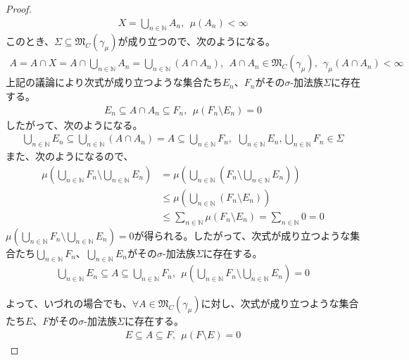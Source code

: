 \documentclass[dvipdfmx]{jsarticle}
\begin{document}
\begin{proof}
\begin{align*}
X = \bigcup_{n \in \mathbb{N}} A_{n},\ \ \mu\left( A_{n} \right) < \infty
\end{align*}
このとき、$\varSigma \subseteq \mathfrak{M}_{C}\left( \gamma_{\mu} \right)$が成り立つので、次のようになる。
\begin{align*}
A = A \cap X = A \cap \bigcup_{n \in \mathbb{N}} A_{n} = \bigcup_{n \in \mathbb{N}} \left( A \cap A_{n} \right),\ \ A \cap A_{n} \in \mathfrak{M}_{C}\left( \gamma_{\mu} \right),\ \ \gamma_{\mu}\left( A \cap A_{n} \right) < \infty
\end{align*}
上記の議論により次式が成り立つような集合たち$E_{n}$、$F_{n}$がその$\sigma$-加法族$\varSigma$に存在する。
\begin{align*}
E_{n} \subseteq A \cap A_{n} \subseteq F_{n},\ \ \mu\left( F_{n} \setminus E_{n} \right) = 0
\end{align*}
したがって、次のようになる。
\begin{align*}
\bigcup_{n \in \mathbb{N}} E_{n} \subseteq \bigcup_{n \in \mathbb{N}} \left( A \cap A_{n} \right) = A \subseteq \bigcup_{n \in \mathbb{N}} F_{n},\ \ \bigcup_{n \in \mathbb{N}} E_{n},\bigcup_{n \in \mathbb{N}} F_{n} \in \varSigma
\end{align*}
また、次のようになるので、
\begin{align*}
\mu\left( \bigcup_{n \in \mathbb{N}} F_{n} \setminus \bigcup_{n \in \mathbb{N}} E_{n} \right) &= \mu\left( \bigcup_{n \in \mathbb{N}} \left( F_{n} \setminus \bigcup_{n \in \mathbb{N}} E_{n} \right) \right)\\
&\leq \mu\left( \bigcup_{n \in \mathbb{N}} \left( F_{n} \setminus E_{n} \right) \right)\\
&\leq \sum_{n \in \mathbb{N}} {\mu\left( F_{n} \setminus E_{n} \right)} = \sum_{n \in \mathbb{N}} 0 = 0
\end{align*}
$\mu\left( \bigcup_{n \in \mathbb{N}} F_{n} \setminus \bigcup_{n \in \mathbb{N}} E_{n} \right) = 0$が得られる。したがって、次式が成り立つような集合たち$\bigcup_{n \in \mathbb{N}} F_{n}$、$\bigcup_{n \in \mathbb{N}} E_{n}$がその$\sigma$-加法族$\varSigma$に存在する。
\begin{align*}
\bigcup_{n \in \mathbb{N}} E_{n} \subseteq A \subseteq \bigcup_{n \in \mathbb{N}} F_{n},\ \ \mu\left( \bigcup_{n \in \mathbb{N}} F_{n} \setminus \bigcup_{n \in \mathbb{N}} E_{n} \right) = 0
\end{align*}\par
よって、いづれの場合でも、$\forall A \in \mathfrak{M}_{C}\left( \gamma_{\mu} \right)$に対し、次式が成り立つような集合たち$E$、$F$がその$\sigma$-加法族$\varSigma$に存在する。
\begin{align*}
E \subseteq A \subseteq F,\ \ \mu(F \setminus E) = 0
\end{align*}
\end{proof}
\end{document}
